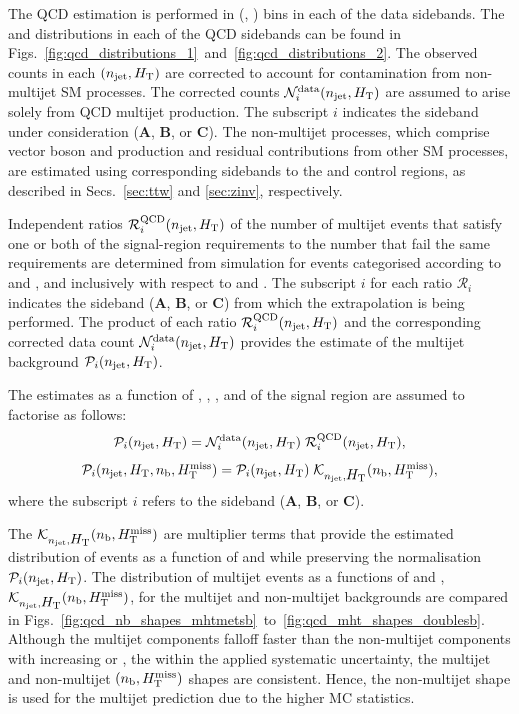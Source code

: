 The QCD estimation is performed in (\njet, \scalht) bins in each of the data
sidebands. The \njet and \scalht distributions in each of the QCD sidebands
can be found in Figs.~\ref{fig:qcd_distributions_1}~and~\ref{fig:qcd_distributions_2}.
The observed counts in each $(n_{\text{jet}}, \mbox{$H_\text{T}$})$ are corrected to account
for contamination from non-multijet SM processes. The corrected counts
$\mathcal{N}_i^\text{data}(n_{\text{jet}}, \mbox{$H_\text{T}$})$ are assumed to arise solely
from QCD multijet production. The subscript $i$ indicates the sideband
under consideration (\textbf{A}, \textbf{B}, or \textbf{C}). The non-multijet
processes, which comprise vector boson and \ttbar production and residual
contributions from other SM processes, are estimated using corresponding
sidebands to the \mj and \mmj control regions, as described in
Secs.~\ref{sec:ttw} and \ref{sec:zinv}, respectively.

Independent ratios $\mathcal{R}_i^\mathrm{QCD}(n_{\text{jet}}, \mbox{$H_\text{T}$})$ of the
number of multijet events that satisfy one or both of the
signal-region requirements to the number that fail the same
requirements are determined from simulation for events categorised
according to \njet and \scalht, and inclusively with respect to \nb
and \HTmiss. The subscript $i$ for each ratio $\mathcal{R}_i$
indicates the sideband (\textbf{A}, \textbf{B}, or \textbf{C}) from
which the extrapolation is being performed. The product of each ratio
$\mathcal{R}_i^\mathrm{QCD}(n_{\text{jet}}, \mbox{$H_\text{T}$})$ and the corresponding
corrected data count $\mathcal{N}_i^\text{data}(n_{\text{jet}}, \mbox{$H_\text{T}$})$
provides the estimate of the multijet background $\mathcal{P}_i(n_{\text{jet}},
\mbox{$H_\text{T}$})$. 

The estimates as a function of \njet, \scalht, \nb, and \HTmiss of the
signal region are assumed to factorise as follows:
\begin{equation}
  \label{eq:qcd1}
  \mathcal{P}_i( n_{\text{jet}}, \mbox{$H_\text{T}$} )  =
  \mathcal{N}_i^\text{data}( n_{\text{jet}}, \mbox{$H_\text{T}$} )\;
  \mathcal{R}_i^\mathrm{QCD}( n_{\text{jet}}, \mbox{$H_\text{T}$} ),
\end{equation}
\begin{equation}
  \label{eq:qcd2}
  \mathcal{P}_i( n_{\text{jet}}, \mbox{$H_\text{T}$}, n_{\text{b}}, \mbox{$H_{\rm T}^{\rm miss}$} ) = 
  \mathcal{P}_i( n_{\text{jet}}, \mbox{$H_\text{T}$} )\;
  \mathcal{K}_{n_{\text{jet}}, \mbox{$H_\text{T}$}}( n_{\text{b}}, \mbox{$H_{\rm T}^{\rm miss}$} ), 
\end{equation}
where the subscript $i$ refers to the sideband (\textbf{A},
\textbf{B}, or \textbf{C}). 

The $\mathcal{K}_{n_{\text{jet}}, \mbox{$H_\text{T}$}}( n_{\text{b}}, \mbox{$H_{\rm T}^{\rm miss}$} )$ are multiplier
terms that provide the estimated distribution of events as a function
of \nb and \HTmiss while preserving the normalisation $\mathcal{P}_i(
n_{\text{jet}}, \mbox{$H_\text{T}$} )$. The distribution of multijet events as a functions
of \nb and \HTmiss, $\mathcal{K}_{n_{\text{jet}}, \mbox{$H_\text{T}$}}( n_{\text{b}}, \mbox{$H_{\rm T}^{\rm miss}$} )$, for
the multijet and non-multijet backgrounds are compared in 
Figs.~\ref{fig:qcd_nb_shapes_mhtmetsb}~to~\ref{fig:qcd_mht_shapes_doublesb}.
Although the multijet components falloff faster than the non-multijet
components with increasing \nb or \HTmiss, the within the applied
systematic uncertainty, the multijet and non-multijet $(n_{\text{b}}, \mbox{$H_{\rm T}^{\rm miss}$})$
shapes are consistent. Hence, the non-multijet shape is used for the
multijet prediction due to the higher MC statistics.

